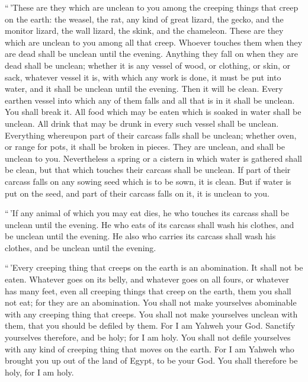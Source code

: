  ``\,'These are they which are unclean to you among the
creeping things that creep on the earth: the weasel, the rat, any kind
of great lizard,  the gecko, and the monitor lizard, the
wall lizard, the skink, and the chameleon.  These are
they which are unclean to you among all that creep. Whoever touches them
when they are dead shall be unclean until the evening. 
Anything they fall on when they are dead shall be unclean; whether it is
any vessel of wood, or clothing, or skin, or sack, whatever vessel it
is, with which any work is done, it must be put into water, and it shall
be unclean until the evening. Then it will be clean. 
Every earthen vessel into which any of them falls and all that is in it
shall be unclean. You shall break it.  All food which may
be eaten which is soaked in water shall be unclean. All drink that may
be drunk in every such vessel shall be unclean. 
Everything whereupon part of their carcass falls shall be unclean;
whether oven, or range for pots, it shall be broken in pieces. They are
unclean, and shall be unclean to you.  Nevertheless a
spring or a cistern in which water is gathered shall be clean, but that
which touches their carcass shall be unclean.  If part of
their carcass falls on any sowing seed which is to be sown, it is clean.
 But if water is put on the seed, and part of their
carcass falls on it, it is unclean to you.

 ``\,'If any animal of which you may eat dies, he who
touches its carcass shall be unclean until the evening. 
He who eats of its carcass shall wash his clothes, and be unclean until
the evening. He also who carries its carcass shall wash his clothes, and
be unclean until the evening.

 ``\,'Every creeping thing that creeps on the earth is an
abomination. It shall not be eaten.  Whatever goes on its
belly, and whatever goes on all fours, or whatever has many feet, even
all creeping things that creep on the earth, them you shall not eat; for
they are an abomination.  You shall not make yourselves
abominable with any creeping thing that creeps. You shall not make
yourselves unclean with them, that you should be defiled by them.
 For I am Yahweh your God. Sanctify yourselves therefore,
and be holy; for I am holy. You shall not defile yourselves with any
kind of creeping thing that moves on the earth.  For I am
Yahweh who brought you up out of the land of Egypt, to be your God. You
shall therefore be holy, for I am holy.

